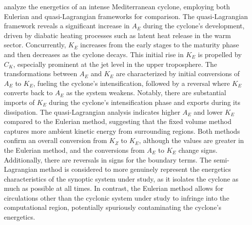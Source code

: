 
\citet{michaelides1999quasi} analyze the energetics of an intense Mediterranean cyclone, employing both Eulerian and quasi-Lagrangian frameworks for comparison. The quasi-Lagrangian framework reveals a significant increase in \(A_E\) during the cyclone's development, driven by diabatic heating processes such as latent heat release in the warm sector. Concurrently, \(K_E\) increases from the early stages to the maturity phase and then decreases as the cyclone decays. This initial rise in \(K_E\) is propelled by \(C_K\), especially prominent at the jet level in the upper troposphere. The transformations between \(A_E\) and \(K_E\) are characterized by initial conversions of \(A_E\) to \(K_E\), fueling the cyclone's intensification, followed by a reversal where \(K_E\) converts back to \(A_E\) as the system weakens. Notably, there are substantial imports of \(K_E\) during the cyclone's intensification phase and exports during its dissipation. The quasi-Lagrangian analysis indicates higher \(A_E\) and lower \(K_E\) compared to the Eulerian method, suggesting that the fixed volume method captures more ambient kinetic energy from surrounding regions. Both methods confirm an overall conversion from \(K_Z\) to \(K_E\), although the values are greater in the Eulerian method, and the conversions from \(A_E\) to \(K_E\) change signs. Additionally, there are reversals in signs for the boundary terms. The semi-Lagrangian method is considered to more genuinely represent the energetics characteristics of the synoptic system under study, as it isolates the cyclone as much as possible at all times. In contrast, the Eulerian method allows for circulations other than the cyclonic system under study to infringe into the computational region, potentially spuriously contaminating the cyclone's energetics.

